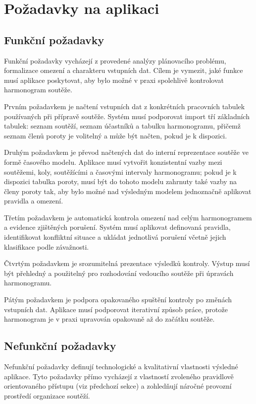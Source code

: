 \documentclass[czech, kiv, ba, he, iso690alph, pdf]{fasthesis}
\begin{document}
		\section{Požadavky na aplikaci}
	
			\subsection{Funkční požadavky}
				Funkční požadavky vycházejí z provedené analýzy plánovacího problému, formalizace omezení a charakteru vstupních dat. Cílem je vymezit, jaké funkce musí aplikace poskytovat, aby bylo možné v praxi spolehlivě kontrolovat harmonogram soutěže.
			
				Prvním požadavkem je načtení vstupních dat z konkrétních pracovních tabulek používaných při přípravě soutěže. Systém musí podporovat import tří základních tabulek: seznam soutěží, seznam účastníků a tabulku harmonogramu, přičemž seznam členů poroty je volitelný a může být načten, pokud je k dispozici.
			
				Druhým požadavkem je převod načtených dat do interní reprezentace soutěže ve formě časového modelu. Aplikace musí vytvořit konzistentní vazby mezi soutěžemi, koly, soutěžícími a časovými intervaly harmonogramu; pokud je k dispozici tabulka poroty, musí být do tohoto modelu zahrnuty také vazby na členy poroty tak, aby bylo možné nad výsledným modelem jednoznačně aplikovat pravidla a omezení.
			
				Třetím požadavkem je automatická kontrola omezení nad celým harmonogramem a evidence zjištěných porušení. Systém musí aplikovat definovaná pravidla, identifikovat konfliktní situace a ukládat jednotlivá porušení včetně jejich klasifikace podle závažnosti.
			
				Čtvrtým požadavkem je srozumitelná prezentace výsledků kontroly. Výstup musí být přehledný a použitelný pro rozhodování vedoucího soutěže při úpravách harmonogramu.
			
				Pátým požadavkem je podpora opakovaného spuštění kontroly po změnách vstupních dat. Aplikace musí podporovat iterativní způsob práce, protože harmonogram je v praxi upravován opakovaně až do začátku soutěže.
	
	
	
			\subsection{Nefunkční požadavky}
			
				Nefunkční požadavky definují technologické a kvalitativní vlastnosti výsledné aplikace. Tyto požadavky přímo vycházejí z vlastností zvoleného pravidlově orientovaného přístupu (viz předchozí sekce) a zohledňují náročné provozní prostředí organizace soutěží.
			
\end{document}
